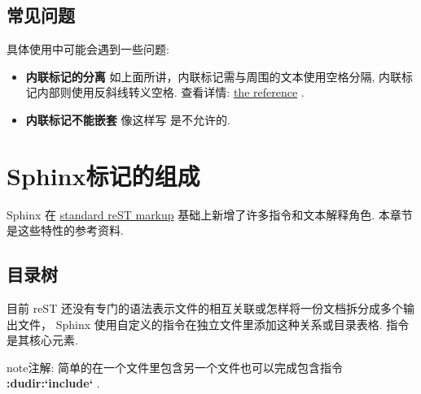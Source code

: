 \documentclass[letterpaper,10pt,english]{sphinxmanual}
\begin{document}
\section{常见问题}
\label{rest:id151}
具体使用中可能会遇到一些问题:
\begin{itemize}
\item {} 
\textbf{内联标记的分离} 如上面所讲，内联标记需与周围的文本使用空格分隔, 内联标记内部则使用反斜线转义空格.  查看详情: \href{http://docutils.sf.net/docs/ref/rst/restructuredtext.html\#inline-markup}{the reference} .

\item {} 
\textbf{内联标记不能嵌套}  像这样写  是不允许的.

\end{itemize}


\chapter{Sphinx标记的组成}
\label{markup/index::doc}\label{markup/index:sphinxmarkup}\label{markup/index:sphinx}
Sphinx 在 \href{http://docutils.sourceforge.net/docs/ref/rst/restructuredtext.html}{standard reST
markup} 基础上新增了许多指令和文本解释角色.  本章节是这些特性的参考资料.


\section{目录树}
\label{markup/toctree::doc}\label{markup/toctree:toctree-directive}\label{markup/toctree:id1}
目前 reST 还没有专门的语法表示文件的相互关联或怎样将一份文档拆分成多个输出文件，
Sphinx 使用自定义的指令在独立文件里添加这种关系或目录表格.
指令  是其核心元素.

\begin{notice}{note}{注解:}
简单的在一个文件里包含另一个文件也可以完成包含指令 {\color{red}\bfseries{}:dudir:{}`include{}`} .
\end{notice}
\end{document}
